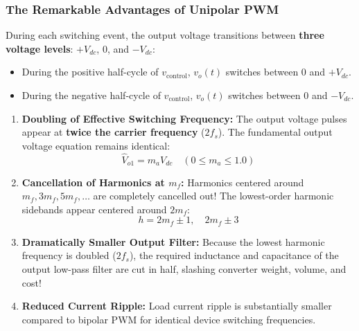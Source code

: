 \documentclass[11pt,a4paper]{article}
\begin{document}
\subsubsection{The Remarkable Advantages of Unipolar PWM}
During each switching event, the output voltage transitions between \textbf{three voltage levels}: $+V_{dc}$, $0$, and $-V_{dc}$:
\begin{itemize}
  \item During the positive half-cycle of $v_{\text{control}}$, $v_o(t)$ switches between $0$ and $+V_{dc}$.
  \item During the negative half-cycle of $v_{\text{control}}$, $v_o(t)$ switches between $0$ and $-V_{dc}$.
\end{itemize}
\begin{conceptbox}
\begin{enumerate}
  \item \textbf{Doubling of Effective Switching Frequency:} The output voltage pulses appear at \textbf{twice the carrier frequency} ($2f_s$). The fundamental output voltage equation remains identical:
  \begin{equation}
  \hat{V}_{o1} = m_a V_{dc} \quad (0 \le m_a \le 1.0)
  \end{equation}
  \item \textbf{Cancellation of Harmonics at $m_f$:} Harmonics centered around $m_f, 3m_f, 5m_f, \dots$ are completely cancelled out! The lowest-order harmonic sidebands appear centered around $2m_f$:
  \begin{equation}
  h = 2m_f \pm 1, \quad 2m_f \pm 3
  \end{equation}
  \item \textbf{Dramatically Smaller Output Filter:} Because the lowest harmonic frequency is doubled ($2f_s$), the required inductance and capacitance of the output low-pass filter are cut in half, slashing converter weight, volume, and cost!
  \item \textbf{Reduced Current Ripple:} Load current ripple is substantially smaller compared to bipolar PWM for identical device switching frequencies.
\end{enumerate}
\end{conceptbox}
\end{document}
